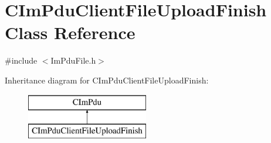 \hypertarget{class_c_im_pdu_client_file_upload_finish}{}\section{C\+Im\+Pdu\+Client\+File\+Upload\+Finish Class Reference}
\label{class_c_im_pdu_client_file_upload_finish}


{\ttfamily \#include $<$Im\+Pdu\+File.\+h$>$}

Inheritance diagram for C\+Im\+Pdu\+Client\+File\+Upload\+Finish\+:\begin{figure}[H]
\begin{center}
\leavevmode
\includegraphics[height=2.000000cm]{class_c_im_pdu_client_file_upload_finish}
\end{center}
\end{figure}
